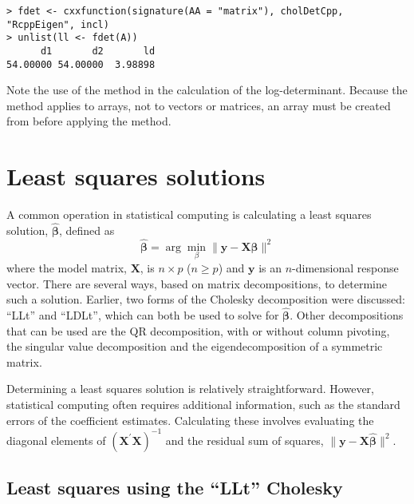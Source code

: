 \documentclass[shortnames,article]{jss}
\begin{document}
\begin{verbatim}
> fdet <- cxxfunction(signature(AA = "matrix"), cholDetCpp, "RcppEigen", incl)
> unlist(ll <- fdet(A))
      d1       d2       ld 
54.00000 54.00000  3.98898 
\end{verbatim}


Note the use of the  method in the calculation of the
log-determinant.  Because the  method applies to arrays,
not to vectors or matrices, an array must be created from 
before applying the  method.

\section{Least squares solutions}
\label{sec:leastSquares}

A common operation in statistical computing is calculating a least
squares solution, $\widehat{\bm\beta}$, defined as
\begin{displaymath}
  \widehat{\bm\beta}=\arg\min_{\beta}\|\bm y-\bm X\bm\beta\|^2
\end{displaymath}
where the model matrix, $\bm X$, is $n\times p$ ($n\ge p$) and $\bm y$
is an $n$-dimensional response vector.  There are several ways, based
on matrix decompositions, to determine such a solution.  Earlier, two forms
of the Cholesky decomposition were discussed: ``LLt'' and
``LDLt'', which can both be used to solve for $\widehat{\bm\beta}$.  Other
decompositions that can be used are the QR decomposition, with or
without column pivoting, the singular value decomposition and the
eigendecomposition of a symmetric matrix.

Determining a least squares solution is relatively straightforward.
However, statistical computing often requires additional information,
such as the standard errors of the coefficient estimates.  Calculating
these involves evaluating the diagonal elements of $\left(\bm
  X^\prime\bm X\right)^{-1}$ and the residual sum of squares, $\|\bm
y-\bm X\widehat{\bm\beta}\|^2$.

\subsection{Least squares using the ``LLt'' Cholesky}
\label{sec:LLtLeastSquares}
\end{document}
